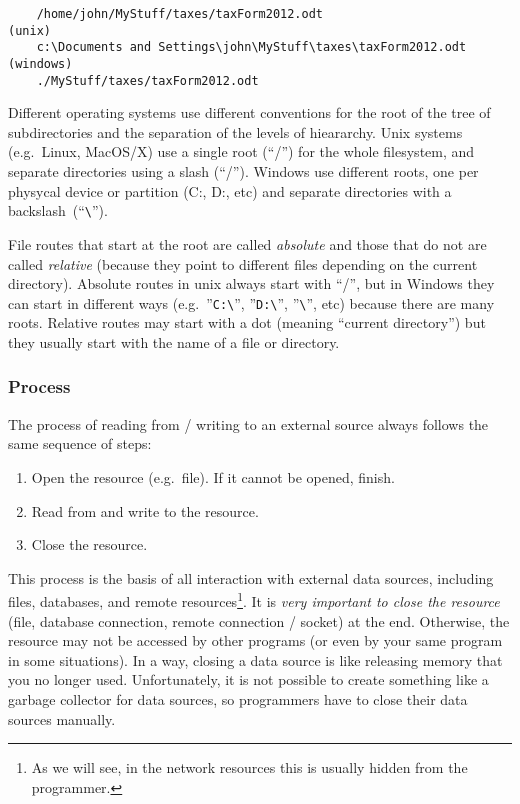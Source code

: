 \begin{verbatim}
    /home/john/MyStuff/taxes/taxForm2012.odt                     (unix)
    c:\Documents and Settings\john\MyStuff\taxes\taxForm2012.odt (windows)
    ./MyStuff/taxes/taxForm2012.odt
\end{verbatim}

Different operating systems use different conventions for the root of
the tree of subdirectories and the separation of the levels of
hieararchy. Unix systems (e.g.~Linux, MacOS/X) use a single root
(``/'') for the whole filesystem, and separate directories using a
slash (``/''). Windows use different roots, one per physycal device or
partition (C:, D:, etc) and separate directories with a 
backslash~(``\verb+\+''). 

File routes that start at the root are called \emph{absolute} and
those that do not are called \emph{relative} (because they point to
different files depending on the current directory). Absolute routes in
unix always start with ``/'', but in Windows they can start in
different ways (e.g.~''\verb+C:\+'', ''\verb+D:\+'', ''\verb+\+'',
etc) because there are many roots. Relative routes may start with
a dot (meaning ``current directory'') but they usually start with the
name of a file or directory. 


\subsubsection{Process}
\label{sec:process}

The process of reading from / writing to an external source always
follows the same sequence of steps:

\begin{enumerate}
\item Open the resource (e.g.~file). If it cannot be opened, finish.
\item Read from and write to the resource.
\item Close the resource. 
\end{enumerate}

This process is the basis of all interaction with external data
sources, including files, databases, and remote resources\footnote{As
  we will see, in the network resources this is usually hidden from
  the programmer.}.
It is \emph{very important to close the resource} (file, database
connection, remote connection / socket) at the
end. Otherwise, the resource may not be accessed by other programs (or
even by your same program in some situations). In a way, closing a
data source is like releasing memory that you no longer
used. Unfortunately, it is not possible to create something like a
garbage collector for data sources, so programmers have to close their
data sources manually.

